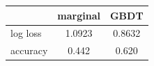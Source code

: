 \begin{tabular}{lcc}
\toprule
 & marginal & GBDT \\
\midrule
log loss & 1.0923 & 0.8632 \\
accuracy & 0.442 & 0.620 \\
\bottomrule
\end{tabular}
